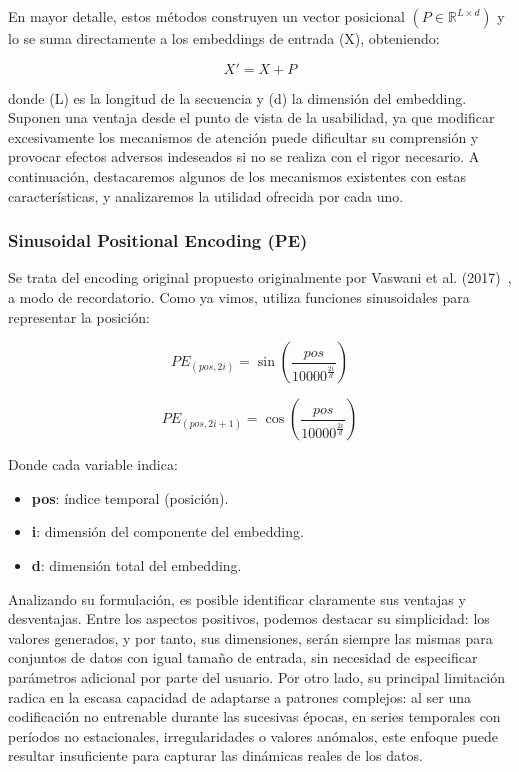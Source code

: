 En mayor detalle, estos métodos construyen un vector posicional $(P \in \mathbb{R}^{L \times d})$ y lo se suma directamente a los embeddings de entrada (X), obteniendo:

$$ X' = X + P $$

donde (L) es la longitud de la secuencia y (d) la dimensión del embedding.\\

Suponen una ventaja desde el punto de vista de la usabilidad, ya que modificar excesivamente los mecanismos de atención puede dificultar su comprensión y provocar efectos adversos indeseados si no se realiza con el rigor necesario. A continuación, destacaremos algunos de los mecanismos existentes con estas características, y analizaremos la utilidad ofrecida por cada uno.

\subsubsection{Sinusoidal Positional Encoding (PE)}

Se trata del encoding original propuesto originalmente por Vaswani et al. (2017)~\cite{vaswani2023attentionneed}, a modo de recordatorio. Como ya vimos, utiliza funciones sinusoidales para representar la posición:

$$
PE_{(pos, 2i)} = \sin\left(\frac{pos}{10000^{\frac{2i}{d}}}\right)
$$

$$
PE_{(pos, 2i+1)} = \cos\left(\frac{pos}{10000^{\frac{2i}{d}}}\right)
$$

Donde cada variable indica:

\begin{itemize}
	\item \textbf{pos}: índice temporal (posición).
	\item \textbf{i}: dimensión del componente del embedding.
	\item \textbf{d}: dimensión total del embedding.
\end{itemize}

Analizando su formulación, es posible identificar claramente sus ventajas y desventajas. Entre los aspectos positivos, podemos destacar su simplicidad: los valores generados, y por tanto, sus dimensiones, serán siempre las mismas para conjuntos de datos con igual tamaño de entrada, sin necesidad de especificar parámetros adicional por parte del usuario. Por otro lado, su principal limitación radica en la escasa capacidad de adaptarse a patrones complejos: al ser una codificación no entrenable durante las sucesivas épocas, en series temporales con períodos no estacionales, irregularidades o valores anómalos, este enfoque puede resultar insuficiente para capturar las dinámicas reales de los datos.\\

